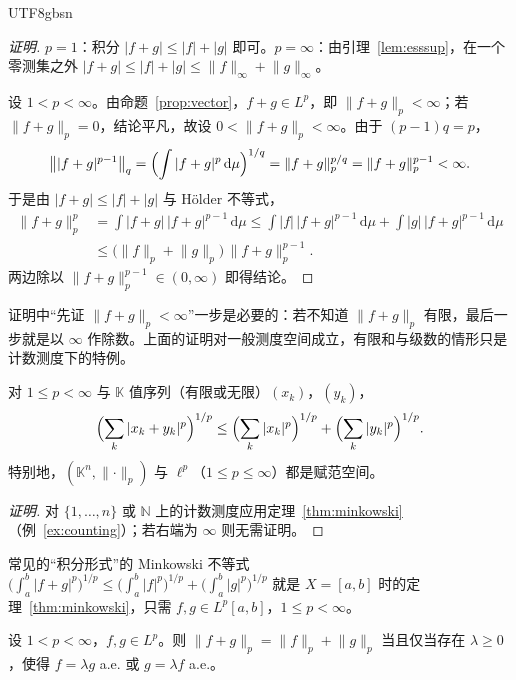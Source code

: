 \documentclass[11pt]{article}
\newcommand{\K}{\mathbb{K}}
\newcommand{\N}{\mathbb{N}}
\newcommand{\norm}[1]{\lVert #1\rVert}
\newcommand{\dmu}{\,\mathrm{d}\mu}
\begin{document}
\begin{CJK*}{UTF8}{gbsn}
\begin{proof}[证明]
$p=1$：积分 $|f+g|\le|f|+|g|$ 即可。$p=\infty$：由引理~\ref{lem:esssup}，在一个零测集之外 $|f+g|\le|f|+|g|\le\norm{f}_{\infty}+\norm{g}_{\infty}$。

设 $1<p<\infty$。由命题~\ref{prop:vector}，$f+g\in L^{p}$，即 $\norm{f+g}_{p}<\infty$；若 $\norm{f+g}_{p}=0$，结论平凡，故设 $0<\norm{f+g}_{p}<\infty$。由于 $(p-1)q=p$，
\[
\bigl\||f+g|^{p-1}\bigr\|_{q}=\Bigl(\int|f+g|^{p}\dmu\Bigr)^{1/q}=\norm{f+g}_{p}^{p/q}=\norm{f+g}_{p}^{p-1}<\infty .
\]
于是由 $|f+g|\le|f|+|g|$ 与 Hölder 不等式，
\[
\begin{aligned}
\norm{f+g}_{p}^{p}&=\int|f+g|\,|f+g|^{p-1}\dmu
\le\int|f|\,|f+g|^{p-1}\dmu+\int|g|\,|f+g|^{p-1}\dmu\\
&\le\bigl(\norm{f}_{p}+\norm{g}_{p}\bigr)\,\norm{f+g}_{p}^{p-1}.
\end{aligned}
\]
两边除以 $\norm{f+g}_{p}^{p-1}\in(0,\infty)$ 即得结论。
\end{proof}

\begin{remark}
证明中“先证 $\norm{f+g}_{p}<\infty$”一步是必要的：若不知道 $\norm{f+g}_{p}$ 有限，最后一步就是以 $\infty$ 作除数。上面的证明对一般测度空间成立，有限和与级数的情形只是计数测度下的特例。
\end{remark}

\begin{corollary}\label{cor:mink-discrete}
对 $1\le p<\infty$ 与 $\K$ 值序列（有限或无限）$(x_{k})$，$(y_{k})$，
\[
\Bigl(\sum_{k}|x_{k}+y_{k}|^{p}\Bigr)^{1/p}\le\Bigl(\sum_{k}|x_{k}|^{p}\Bigr)^{1/p}+\Bigl(\sum_{k}|y_{k}|^{p}\Bigr)^{1/p}.
\]
特别地，$(\K^{n},\norm{\cdot}_{p})$ 与 $\ell^{p}$（$1\le p\le\infty$）都是赋范空间。
\end{corollary}

\begin{proof}[证明]
对 $\{1,\dots,n\}$ 或 $\N$ 上的计数测度应用定理~\ref{thm:minkowski}（例~\ref{ex:counting}）；若右端为 $\infty$ 则无需证明。
\end{proof}

常见的“积分形式”的 Minkowski 不等式 $\bigl(\int_{a}^{b}|f+g|^{p}\bigr)^{1/p}\le\bigl(\int_{a}^{b}|f|^{p}\bigr)^{1/p}+\bigl(\int_{a}^{b}|g|^{p}\bigr)^{1/p}$ 就是 $X=[a,b]$ 时的定理~\ref{thm:minkowski}，只需 $f,g\in L^{p}[a,b]$，$1\le p<\infty$。

\begin{theorem}\label{thm:mink-eq}
设 $1<p<\infty$，$f,g\in L^{p}$。则 $\norm{f+g}_{p}=\norm{f}_{p}+\norm{g}_{p}$ 当且仅当存在 $\lambda\ge0$，使得 $f=\lambda g$ a.e. 或 $g=\lambda f$ a.e.。
\end{theorem}


\end{CJK*}
\end{document}
